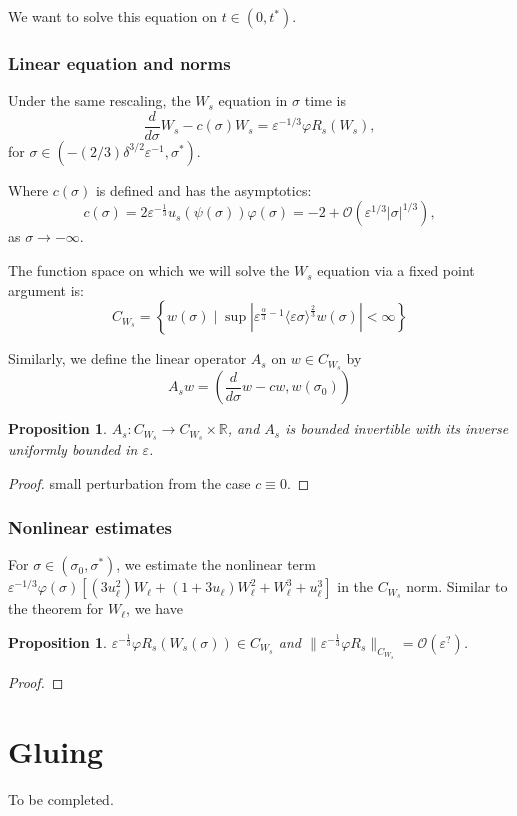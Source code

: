 \documentclass[letterpaper,11pt]{article}
\newcommand{\rmO}{\mathcal{O}}
\newcommand{\eps}{\varepsilon}
\numberwithin{equation}{section}
\theoremstyle{plain}
\newtheorem{proposition}[theorem]{Proposition}
\begin{document}
We want to solve this equation on $t\in (0, t^*)$.
\subsubsection{Linear equation and norms}
Under the same rescaling, the $W_s$ equation in $\sigma$ time is
\begin{equation}
\frac{d}{d\sigma} W_s - c(\sigma)W_s = \eps^{-1/3}\varphi R_s(W_s),
\end{equation}
for $\sigma \in (-(2/3)\delta^{3/2}\eps^{-1}, \sigma^*)$.

Where $c(\sigma)$ is defined and has the asymptotics:
\[
c(\sigma) = 2\eps^{-\frac{1}{3}}u_s(\psi(\sigma))\varphi(\sigma) = -2 + \rmO(\eps^{1/3}|\sigma|^{1/3}),
\]
as $\sigma \to -\infty$.

The function space on which we will solve the $W_s$ equation via a fixed point argument is:
\[
C_{W_s} = \left\{ w(\sigma) \mid \sup |\eps^{\frac{\alpha}{3} -1 }\langle \eps\sigma \rangle^{\frac{2}{3}} w(\sigma)|<\infty \right\}
\]


Similarly, we define the linear operator $A_s$ on $w \in C_{W_s}$ by \[
A_s w = \left(\frac{d}{d\sigma}w - cw, w(\sigma_0)\right)
\]

\begin{proposition}
$A_s : C_{W_s} \to C_{W_s} \times \mathbb{R}$, and $A_s$ is bounded invertible with its inverse uniformly bounded in $\eps$.
\end{proposition}
\begin{proof}
small perturbation from the case $c \equiv 0$.
\end{proof}


\subsubsection{Nonlinear estimates}

For $\sigma \in (\sigma_0, \sigma^*)$, we estimate the nonlinear term $\eps^{-1/3}\varphi(\sigma)\left[ (3u_\ell^2)W_\ell + (1+3u_\ell)W_\ell^2 + W_\ell^3+u_\ell^3\right]$ in the $C_{W_s}$ norm. Similar to the theorem for $W_\ell$, we have
\begin{proposition}
$ \eps^{-\frac{1}{3}}\varphi R_s(W_s(\sigma))  \in C_{W_s}$ and $\| \eps^{-\frac{1}{3}}\varphi R_s \|_{C_{W_s}} = \rmO(\eps^{?})$.
\end{proposition}

\begin{proof}
\end{proof}
\section{Gluing}

To be completed.



\end{document}
